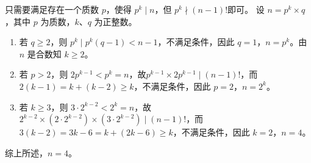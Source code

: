 \documentclass[a4paper,answers]{exam}
\begin{document}
\begin{questions}
\begin{solution}
    只需要满足存在一个质数 $p$，使得 $p^k\mid n$，但 $p^k\nmid (n-1)!$即可。
    设 $n=p^k\times q$，其中 $p$ 为质数，$k$、$q$ 为正整数。
    \begin{enumerate}[label={(\arabic*)}]
        \item 若 $q\geqslant 2$，则 $p^k\mid p^k(q-1) < n-1$，不满足条件，因此 $q=1$，$n=p^k$。由 $n$ 是合数知 $k\geqslant 2$。
        \item 若 $p>2$，则 $2p^{k-1}<p^k=n$，故$p^{k-1}\times 2p^{k-1}\mid (n-1)!$，而 $2(k-1)=k+(k-2)\geqslant k$，不满足条件，因此 $p=2$，$n=2^k$。
        \item 若 $k\geqslant 3$，则 $3\cdot 2^{k-2}<2^k=n$，故 $2^{k-2}\times \left(2\cdot 2^{k-2}\right)\times \left(3\cdot 2^{k-2}\right)\mid (n-1)!$，而 $3(k-2)=3k-6=k+(2k-6)\geqslant k$，不满足条件，因此 $k=2$，$n=4$。
    \end{enumerate}
    综上所述，$n=4$。
\end{solution}

\end{questions}
\end{document}

